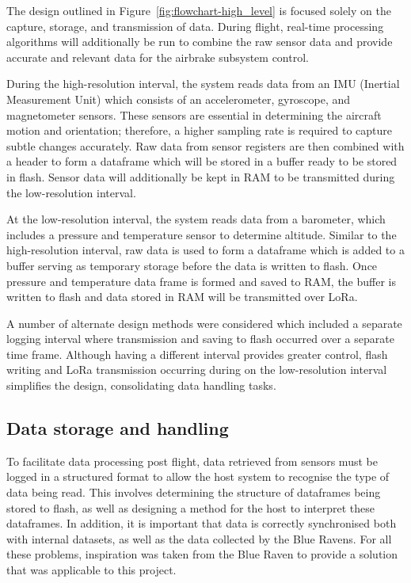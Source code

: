 The design outlined in Figure~\ref{fig:flowchart-high_level} is focused solely on the capture, storage, and transmission of data. During flight, real-time processing algorithms will additionally be run to combine the raw sensor data and provide accurate and relevant data for the airbrake subsystem control.

During the high-resolution interval, the system reads data from an IMU (Inertial Measurement Unit) which consists of an accelerometer, gyroscope, and magnetometer sensors. These sensors are essential in determining the aircraft motion and orientation; therefore, a higher sampling rate is required to capture subtle changes accurately. Raw data from sensor registers are then combined with a header to form a dataframe which will be stored in a buffer ready to be stored in flash. Sensor data will additionally be kept in RAM to be transmitted during the low-resolution interval.  

At the low-resolution interval, the system reads data from a barometer, which includes a pressure and temperature sensor to determine altitude. Similar to the high-resolution interval, raw data is used to form a dataframe which is added to a buffer serving as temporary storage before the data is written to flash. Once pressure and temperature data frame is formed and saved to RAM, the buffer is written to flash and data stored in RAM will be transmitted over LoRa. 

A number of alternate design methods were considered which included a separate logging interval where transmission and saving to flash occurred over a separate time frame. Although having a different interval provides greater control, flash writing and LoRa transmission occurring during on the low-resolution interval simplifies the design, consolidating data handling tasks.  

\subsection{Data storage and handling}
To facilitate data processing post flight, data retrieved from sensors must be logged in a structured format to allow the host system to recognise the type of data being read. This involves determining the structure of dataframes being stored to flash, as well as designing a method for the host to interpret these dataframes. In addition, it is important that data is correctly synchronised both with internal datasets, as well as the data collected by the Blue Ravens. For all these problems, inspiration was taken from the Blue Raven to provide a solution that was applicable to this project.

